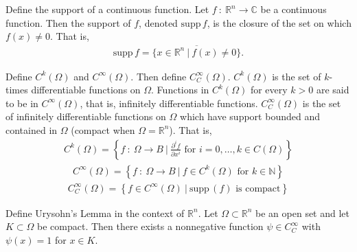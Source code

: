 \documentclass[avery5388,grid,frame]{flashcards}
\newcommand{\supp}{\mathrm{supp}\,}
\newcommand{\f}[3]{#1\ :\ #2 \rightarrow #3}
\def\Rl{\mathbb{R}}
\def\Cx{\mathbb{C}}
\begin{document}


\begin{flashcard}
    {Define the support of a continuous function.}
    Let $\f{f}{\Rl^n}{\Cx}$ be a continuous function.  Then the support of $f$, denoted $\supp f$, is the closure of the set on which $f(x) \neq 0$.  That is,
    \begin{align*}
        \supp f = \overline{\{x \in \Rl^n\ |\ f(x) \neq 0\}}.
    \end{align*}
\end{flashcard}

\begin{flashcard}
    {Define $C^k(\Omega)$ and $C^\infty(\Omega)$.  Then define $C_C^\infty(\Omega)$.}
    $C^k(\Omega)$ is the set of $k$-times differentiable functions on $\Omega$.  Functions in $C^k(\Omega)$ for every $k > 0$ are said to be in $C^\infty(\Omega)$, that is, infinitely differentiable functions.  $C_C^\infty(\Omega)$ is the set of infinitely differentiable functions on $\Omega$ which have support bounded and contained in $\Omega$ (compact when $\Omega = \Rl^n$).  That is,
    \begin{align*}
        C^k(\Omega) = \left\{\f{f}{\Omega}{B}\ |\ \frac{\partial^i f}{\partial x^i} \text{ for } i = 0, \dots, k \in C(\Omega)\right\}
    \end{align*}
    \begin{align*}
        C^\infty(\Omega) = \left\{\f{f}{\Omega}{B}\ |\ f \in C^k(\Omega) \text{ for } k \in \mathbb{N}\right\}
    \end{align*}
    \begin{align*}
        C_C^\infty(\Omega) = \left\{f \in C^\infty(\Omega)\ |\ \supp(f) \text{ is compact} \right\}
    \end{align*}
\end{flashcard}

\begin{flashcard}
    {Define Urysohn's Lemma in the context of $\Rl^n$.}
    Let $\Omega \subset \Rl^n$ be an open set and let $K \subset \Omega$ be compact.  Then there exists a nonnegative function $\psi \in C_C^\infty$ with $\psi(x) = 1$ for $x \in K$.
\end{flashcard}
\end{document}
